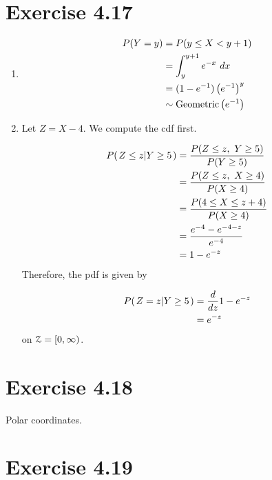 \documentclass[12pt,letterpaper,reqno]{amsart}
\numberwithin{equation}{subsection}
\begin{document}
\newpage
\section{Exercise 4.17}

\begin{enumerate}[label=(\alph*),leftmargin=*]
    \item 
    
    \begin{align*}
        \fun{P}{Y = y} &= \fun{P}{y \leq X < y + 1} \\
        &= \myint{e^{-x}}{x}{y}{y+1} \\
        &= (1-e^{-1}) \left( e^{-1} \right)^y \\
        &\sim \geometricdist{e^{-1}}
    \end{align*}
    
    \item Let $Z = X-4$. We compute the cdf first.
    
    \begin{align*}
        \fun{P}{\conditbar{Z \leq z}{Y \geq 5}} &= \frac{\fun{P}{Z \leq z, \ Y \geq 5}}{\fun{P}{Y \geq 5}} \\
        &= \frac{\fun{P}{Z \leq z, \ X \geq 4}}{\fun{P}{X \geq 4}} \\
        &= \frac{\fun{P}{4 \leq X \leq z + 4}}{\fun{P}{X \geq 4}} \\
        &= \frac{e^{-4}-e^{-4-z}}{e^{-4}} \\
        &= 1- e^{-z}
    \end{align*}
    Therefore, the pdf is given by
    
    \begin{align*}
        \fun{P}{\conditbar{Z = z}{Y \geq 5}} &= \Dif{}{z} 1 - e^{-z} \\
        &= e^{-z}
    \end{align*}
    on $\mycal{Z} = [0, \infty)$.
\end{enumerate}

\newpage
\section{Exercise 4.18}
Polar coordinates.

\newpage
\section{Exercise 4.19}
\end{document}
